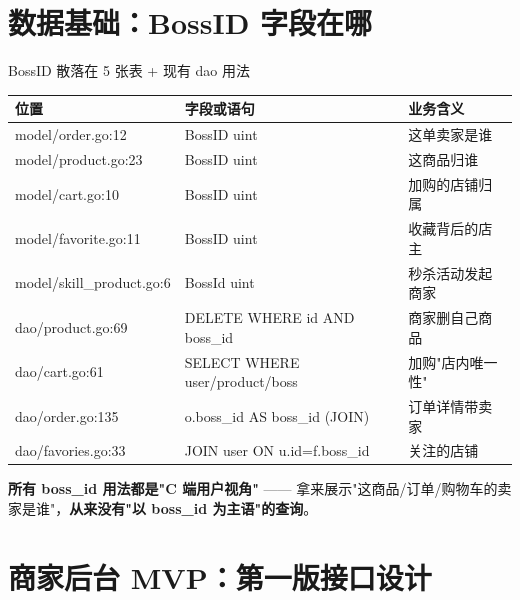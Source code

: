 \section{数据基础：BossID 字段在哪}

\begin{frame}{BossID 散落在 5 张表 + 现有 dao 用法}
\scriptsize
\begin{tabular}{@{}lll@{}}
\toprule
位置 & 字段或语句 & 业务含义 \\
\midrule
model/order.go:12       & BossID uint                    & 这单卖家是谁 \\
model/product.go:23     & BossID uint                    & 这商品归谁 \\
model/cart.go:10        & BossID uint                    & 加购的店铺归属 \\
model/favorite.go:11    & BossID uint                    & 收藏背后的店主 \\
model/skill\_product.go:6& BossId uint                   & 秒杀活动发起商家 \\
dao/product.go:69       & DELETE WHERE id AND boss\_id   & 商家删自己商品 \\
dao/cart.go:61          & SELECT WHERE user/product/boss & 加购"店内唯一性" \\
dao/order.go:135        & o.boss\_id AS boss\_id (JOIN)  & 订单详情带卖家 \\
dao/favories.go:33      & JOIN user ON u.id=f.boss\_id   & 关注的店铺 \\
\bottomrule
\end{tabular}
\vspace{1mm}
\small \textbf{所有 boss\_id 用法都是"C 端用户视角"} —— 拿来展示"这商品/订单/购物车的卖家是谁"，\textbf{从来没有"以 boss\_id 为主语"的查询}。
\end{frame}

\section{商家后台 MVP：第一版接口设计}

